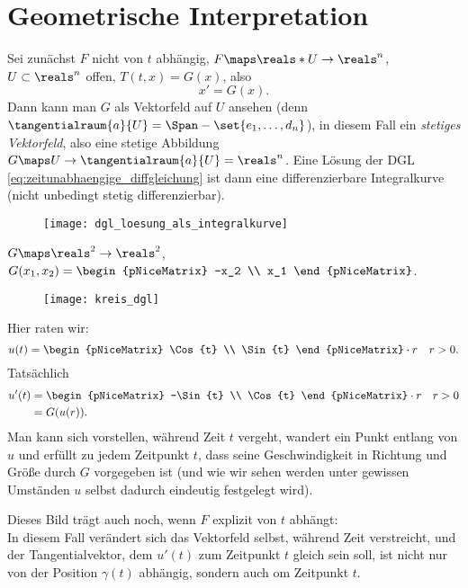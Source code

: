 \section{Geometrische Interpretation}
Sei zunächst \( F \) nicht von \( t \) abhängig, \( F\maps \reals*U\to \reals^n \), \( U\subset \reals^n \) offen, \( T(t,x)=G(x) \), also
\begin{equation*}
  x'=G(x)\tag{\(**\)}\label{eq:zeitunabhaengige_diffgleichung}.
\end{equation*}
Dann kann man \( G \) als Vektorfeld auf \( U \) ansehen (denn \( \tangentialraum{a}{U}=\Span-{\set{e_1,\dotsc,d_n}} \)), in diesem Fall ein \emph{stetiges Vektorfeld}, also eine stetige Abbildung \( G\maps  U \to \tangentialraum{a}{U}=\reals^n \). Eine Lösung der DGL \eqref{eq:zeitunabhaengige_diffgleichung} ist dann eine differenzierbare Integralkurve (nicht unbedingt stetig differenzierbar).
\begin{figure}[H]
  \centering
  \texttt{[image: dgl\_loesung\_als\_integralkurve]}
  \label{fig:dgl_loesung_als_integralkurve}
\end{figure}
\begin{beispiel*}
  \( G\maps \reals^2\to \reals^2 \), \( G(x_1,x_2)=\begin{pNiceMatrix} -x_2 \\ x_1 \end{pNiceMatrix} \).
  \begin{figure}[H]
    \centering
    \texttt{[image: kreis\_dgl]}
    \label{fig:kreis_dgl}
  \end{figure}
  Hier raten wir:
  \begin{equation*}
    u(t)=\begin{pNiceMatrix} \Cos{t} \\ \Sin{t} \end{pNiceMatrix}\cdot r\quad r>0.
  \end{equation*}
  Tatsächlich
  \begin{align*}
    u'(t)&=\begin{pNiceMatrix} -\Sin{t} \\ \Cos{t} \end{pNiceMatrix}\cdot r\quad r>0\\
    &=G(u(r)).
  \end{align*}
  Man kann sich vorstellen, während Zeit \( t \) vergeht, wandert ein Punkt entlang von \( u \) und erfüllt zu jedem Zeitpunkt \( t \), dass seine Geschwindigkeit in Richtung und Größe durch \( G \) vorgegeben ist (und wie wir sehen werden unter gewissen Umständen \( u \) selbst dadurch eindeutig festgelegt wird). 
  
  Dieses Bild trägt auch noch, wenn \( F \) explizit von \( t \) abhängt:\\
  In diesem Fall verändert sich das Vektorfeld selbst, während Zeit verstreicht, und der Tangentialvektor, dem \( u'(t) \) zum Zeitpunkt \( t \) gleich sein soll, ist nicht nur von der Position \( \gamma(t) \) abhängig, sondern auch om Zeitpunkt \( t \).
\end{beispiel*}
